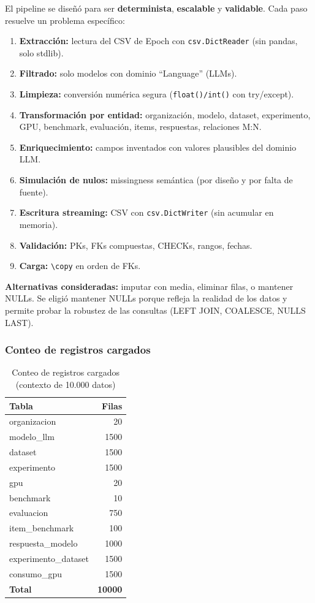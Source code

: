 \documentclass[12pt,a4paper]{article}
\begin{document}
El pipeline se diseñó para ser \textbf{determinista}, \textbf{escalable} y \textbf{validable}. Cada paso resuelve un problema específico:

\begin{enumerate}
  \item \textbf{Extracción:} lectura del CSV de Epoch con \texttt{csv.DictReader} (sin pandas, solo stdlib).
  \item \textbf{Filtrado:} solo modelos con dominio ``Language'' (LLMs).
  \item \textbf{Limpieza:} conversión numérica segura (\texttt{float()/int()} con try/except).
  \item \textbf{Transformación por entidad:} organización, modelo, dataset, experimento, GPU, benchmark, evaluación, items, respuestas, relaciones M:N.
  \item \textbf{Enriquecimiento:} campos inventados con valores plausibles del dominio LLM.
  \item \textbf{Simulación de nulos:} missingness semántica (por diseño y por falta de fuente).
  \item \textbf{Escritura streaming:} CSV con \texttt{csv.DictWriter} (sin acumular en memoria).
  \item \textbf{Validación:} PKs, FKs compuestas, CHECKs, rangos, fechas.
  \item \textbf{Carga:} \texttt{\textbackslash copy} en orden de FKs.
\end{enumerate}

\textbf{Alternativas consideradas:} imputar con media, eliminar filas, o mantener NULLs. Se eligió mantener NULLs porque refleja la realidad de los datos y permite probar la robustez de las consultas (LEFT JOIN, COALESCE, NULLS LAST).

\subsubsection{Conteo de registros cargados}

\begin{table}[H]
\centering
\begin{tabular}{|l|r|}
\hline
\textbf{Tabla} & \textbf{Filas} \\
\hline
organizacion & 20 \\
modelo\_llm & 1500 \\
dataset & 1500 \\
experimento & 1500 \\
gpu & 20 \\
benchmark & 10 \\
evaluacion & 750 \\
item\_benchmark & 100 \\
respuesta\_modelo & 1000 \\
experimento\_dataset & 1500 \\
consumo\_gpu & 1500 \\
\hline
\textbf{Total} & \textbf{10000} \\
\hline
\end{tabular}
\caption{Conteo de registros cargados (contexto de 10.000 datos)}
\end{table}
\end{document}
